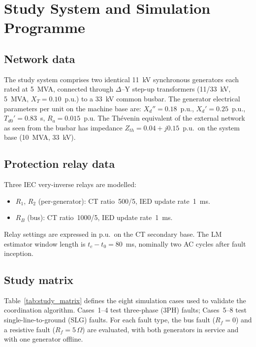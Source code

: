\documentclass[journal,twoside,letterpaper]{IEEEtran}
\begin{document}
\section{Study System and Simulation Programme}
\label{sec:system}

\subsection{Network data}

The study system comprises two identical 11~kV synchronous
generators each rated at 5~MVA, connected through
$\Delta$--Y step-up transformers (11/33~kV, 5~MVA,
$X_T = 0.10$~p.u.) to a 33~kV common busbar.
The generator electrical parameters per unit on the machine
base are: $X_d'' = 0.18$~p.u., $X_d' = 0.25$~p.u.,
$T_{d0}' = 0.83$~s, $R_a = 0.015$~p.u.
The Th\'{e}venin equivalent of the external network as seen
from the busbar has impedance $Z_{th} = 0.04 + j0.15$~p.u.\
on the system base (10~MVA, 33~kV).

\subsection{Protection relay data}

Three IEC very-inverse relays are modelled:
\begin{itemize}
  \item $R_1$, $R_2$ (per-generator): CT ratio~500/5,
    IED update rate~1~ms.
  \item $R_B$ (bus): CT ratio~1000/5, IED update rate~1~ms.
\end{itemize}
Relay settings are expressed in p.u.\ on the CT secondary
base.
The LM estimator window length is $t_c - t_0 = 80$~ms,
nominally two AC cycles after fault inception.

\subsection{Study matrix}

Table~\ref{tab:study_matrix} defines the eight simulation
cases used to validate the coordination algorithm.
Cases~1--4 test three-phase (3PH) faults; Cases~5--8
test single-line-to-ground (SLG) faults.
For each fault type, the bus fault ($R_f = 0$) and a
resistive fault ($R_f = 5\,\Omega$) are evaluated, with
both generators in service and with one generator offline.
\end{document}
